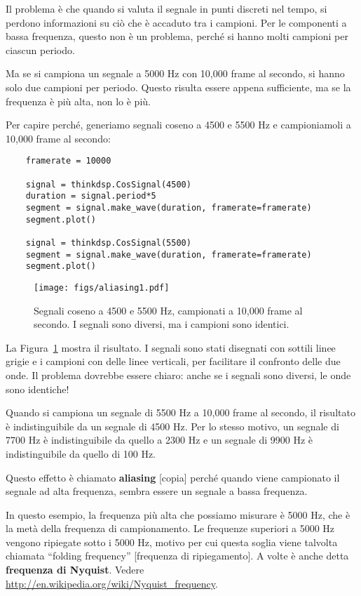 \documentclass[12pt]{book} \usepackage[width=5.5in,height=8.5in, hmarginratio=3:2,vmarginratio=1:1]{geometry}
\begin{document}
Il problema è che quando si valuta il segnale in punti discreti nel tempo, si perdono informazioni su ciò che è accaduto tra i campioni. Per le componenti a bassa frequenza, questo non è un problema, perché si hanno molti campioni per ciascun periodo.

Ma se si campiona un segnale a 5000 Hz con 10,000 frame al secondo, si hanno solo due campioni per periodo. Questo risulta essere appena sufficiente, ma se la frequenza è più alta, non lo è più.

Per capire perché, generiamo segnali coseno a 4500 e 5500 Hz e campioniamoli a 10,000 frame al secondo:

\begin{verbatim} 
    framerate = 10000

    signal = thinkdsp.CosSignal(4500)
    duration = signal.period*5
    segment = signal.make_wave(duration, framerate=framerate)
    segment.plot()

    signal = thinkdsp.CosSignal(5500)
    segment = signal.make_wave(duration, framerate=framerate)
    segment.plot()
 \end{verbatim} 

\begin{figure} 

\centerline{\texttt{[image: figs/aliasing1.pdf]}} \caption{Segnali coseno a 4500 e 5500 Hz, campionati a 10,000 frame al secondo. I segnali sono diversi, ma i campioni sono identici.} \label{fig.aliasing1} \end{figure} 

La Figura~\ref{fig.aliasing1} mostra il risultato. I segnali sono stati disegnati con sottili linee grigie e i campioni con delle linee verticali, per facilitare il confronto delle due onde. Il problema dovrebbe essere chiaro: anche se i segnali sono diversi, le onde sono identiche!

Quando si campiona un segnale di 5500 Hz a 10,000 frame al secondo, il risultato è indistinguibile da un segnale di 4500 Hz. Per lo stesso motivo, un segnale di 7700 Hz è indistinguibile da quello a 2300 Hz e un segnale di 9900 Hz è indistinguibile da quello di 100 Hz.

Questo effetto è chiamato {\bf aliasing} [copia] perché quando viene campionato il segnale ad alta frequenza, sembra essere un segnale a bassa frequenza.

In questo esempio, la frequenza più alta che possiamo misurare è 5000 Hz, che è la metà della frequenza di campionamento. Le frequenze superiori a 5000 Hz vengono ripiegate sotto i 5000 Hz, motivo per cui questa soglia viene talvolta chiamata ``folding frequency'' [frequenza di ripiegamento]. A volte è anche detta {\bf frequenza di Nyquist}. Vedere \url{http://en.wikipedia.org/wiki/Nyquist_frequency}.
\end{document}
